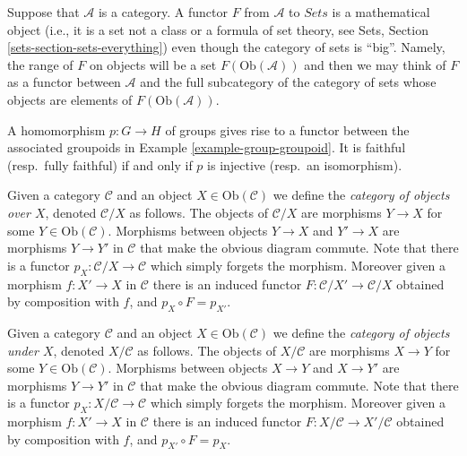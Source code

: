 \begin{remark}
\label{remark-functor-into-sets}
Suppose that $\mathcal{A}$ is a category.
A functor $F$ from $\mathcal{A}$ to $\textit{Sets}$
is a mathematical object (i.e., it is a set not a class or a formula
of set theory, see
Sets, Section \ref{sets-section-sets-everything})
even though the category of sets is ``big''.
Namely, the range of $F$ on objects will be
a set $F(\text{Ob}(\mathcal{A}))$ and then we
may think of $F$ as a functor between
$\mathcal{A}$ and the full subcategory
of the category of sets whose
objects are elements of $F(\text{Ob}(\mathcal{A}))$.
\end{remark}

\begin{example}
\label{example-group-homorphism-functor}
A homomorphism $p : G\to H$ of groups gives rise to a functor
between the associated groupoids in Example \ref{example-group-groupoid}. It is
faithful (resp.\ fully faithful) if and only if $p$ is injective (resp.\ an
isomorphism).
\end{example}

\begin{example}
\label{example-category-over-X}
Given a category $\mathcal{C}$ and an object $X\in \text{Ob}(\mathcal{C})$
we define the {\it category of objects over $X$},
denoted $\mathcal{C}/X$ as follows.
The objects of $\mathcal{C}/X$ are morphisms $Y\to X$ for
some $Y\in \text{Ob}(\mathcal{C})$. Morphisms between objects
$Y\to X$ and $Y'\to X$ are morphisms $Y\to Y'$ in $\mathcal{C}$ that
make the obvious diagram commute.  Note that there is a functor
$p_X : \mathcal{C}/X\to \mathcal{C}$ which simply forgets the
morphism.  Moreover given a morphism $f : X'\to X$ in
$\mathcal{C}$ there is an induced functor
$F : \mathcal{C}/X' \to \mathcal{C}/X$ obtained by composition with $f$,
and $p_X\circ F = p_{X'}$.
\end{example}

\begin{example}
\label{example-category-under-X}
Given a category $\mathcal{C}$ and an object $X\in \text{Ob}(\mathcal{C})$
we define the {\it category of objects under $X$},
denoted $X/\mathcal{C}$ as follows.
The objects of $X/\mathcal{C}$ are morphisms $X\to Y$ for
some $Y\in \text{Ob}(\mathcal{C})$. Morphisms between objects
$X\to Y$ and $X\to Y'$ are morphisms $Y\to Y'$ in $\mathcal{C}$ that
make the obvious diagram commute.  Note that there is a functor
$p_X : X/\mathcal{C}\to \mathcal{C}$ which simply forgets the
morphism.  Moreover given a morphism $f : X'\to X$ in
$\mathcal{C}$ there is an induced functor
$F : X/\mathcal{C} \to X'/\mathcal{C}$
obtained by composition with $f$,
and $p_{X'}\circ F = p_X$.
\end{example}




